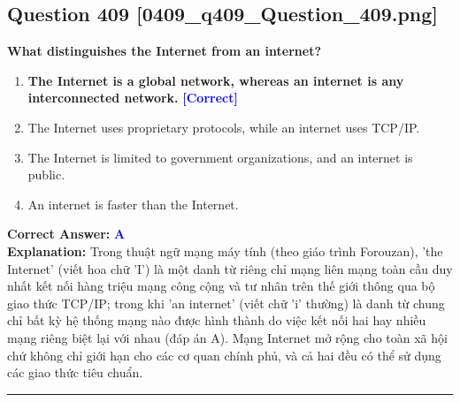 \documentclass[11pt,a4paper]{article}
\begin{document}
\begin{minipage}{\textwidth}
\subsection*{Question 409 \quad \footnotesize{[0409\_q409\_Question\_409.png]}}
\noindent \textbf{What distinguishes the Internet from an internet?}

\begin{enumerate}[label=\Alph*.]
    \item \textbf{The Internet is a global network, whereas an internet is any interconnected network.} \hfill \textcolor{blue}{\textbf{[Correct]}}
    \item The Internet uses proprietary protocols, while an internet uses TCP/IP.
    \item The Internet is limited to government organizations, and an internet is public.
    \item An internet is faster than the Internet.
\end{enumerate}

\noindent \textbf{Correct Answer:} \textcolor{blue}{\textbf{A}} \\[2pt]
\noindent \textbf{Explanation:} Trong thuật ngữ mạng máy tính (theo giáo trình Forouzan), 'the Internet' (viết hoa chữ 'I') là một danh từ riêng chỉ mạng liên mạng toàn cầu duy nhất kết nối hàng triệu mạng công cộng và tư nhân trên thế giới thông qua bộ giao thức TCP/IP; trong khi 'an internet' (viết chữ 'i' thường) là danh từ chung chỉ bất kỳ hệ thống mạng nào được hình thành do việc kết nối hai hay nhiều mạng riêng biệt lại với nhau (đáp án A). Mạng Internet mở rộng cho toàn xã hội chứ không chỉ giới hạn cho các cơ quan chính phủ, và cả hai đều có thể sử dụng các giao thức tiêu chuẩn.

\par\vspace{0.3cm}
\hrule
\vspace{0.3cm}
\end{minipage}
\end{document}
